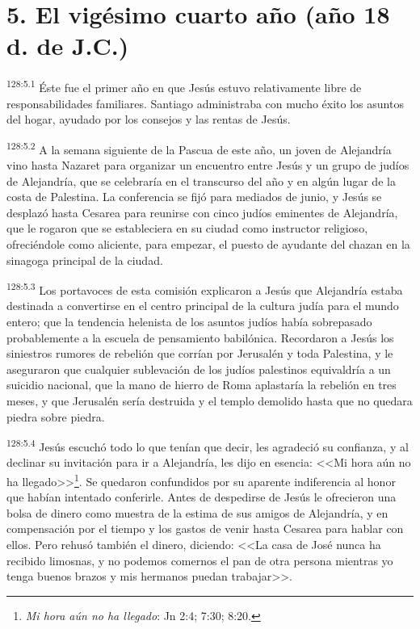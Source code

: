 \section*{5. El vigésimo cuarto año (año 18 d. de J.C.)}
\par 
\textsuperscript{128:5.1} Éste fue el primer año en que Jesús estuvo relativamente libre de responsabilidades familiares. Santiago administraba con mucho éxito los asuntos del hogar, ayudado por los consejos y las rentas de Jesús.

\par 
\textsuperscript{128:5.2} A la semana siguiente de la Pascua de este año, un joven de Alejandría vino hasta Nazaret para organizar un encuentro entre Jesús y un grupo de judíos de Alejandría, que se celebraría en el transcurso del año y en algún lugar de la costa de Palestina. La conferencia se fijó para mediados de junio, y Jesús se desplazó hasta Cesarea para reunirse con cinco judíos eminentes de Alejandría, que le rogaron que se estableciera en su ciudad como instructor religioso, ofreciéndole como aliciente, para empezar, el puesto de ayudante del chazan en la sinagoga principal de la ciudad.

\par 
\textsuperscript{128:5.3} Los portavoces de esta comisión explicaron a Jesús que Alejandría estaba destinada a convertirse en el centro principal de la cultura judía para el mundo entero; que la tendencia helenista de los asuntos judíos había sobrepasado probablemente a la escuela de pensamiento babilónica. Recordaron a Jesús los siniestros rumores de rebelión que corrían por Jerusalén y toda Palestina, y le aseguraron que cualquier sublevación de los judíos palestinos equivaldría a un suicidio nacional, que la mano de hierro de Roma aplastaría la rebelión en tres meses, y que Jerusalén sería destruida y el templo demolido hasta que no quedara piedra sobre piedra.

\par 
\textsuperscript{128:5.4} Jesús escuchó todo lo que tenían que decir, les agradeció su confianza, y al declinar su invitación para ir a Alejandría, les dijo en esencia: <<Mi hora aún no ha llegado>>\footnote{\textit{Mi hora aún no ha llegado}: Jn 2:4; 7:30; 8:20.}. Se quedaron confundidos por su aparente indiferencia al honor que habían intentado conferirle. Antes de despedirse de Jesús le ofrecieron una bolsa de dinero como muestra de la estima de sus amigos de Alejandría, y en compensación por el tiempo y los gastos de venir hasta Cesarea para hablar con ellos. Pero rehusó también el dinero, diciendo: <<La casa de José nunca ha recibido limosnas, y no podemos comernos el pan de otra persona mientras yo tenga buenos brazos y mis hermanos puedan trabajar>>.

